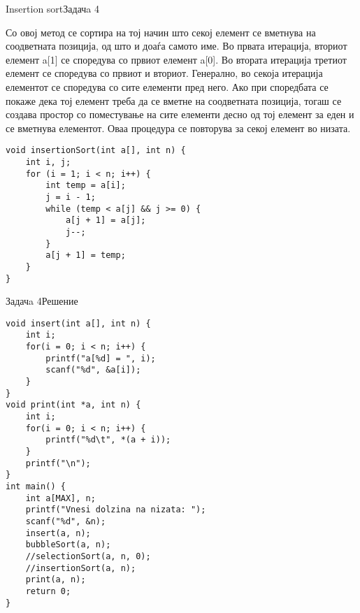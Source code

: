 \begin{frame}[fragile]{Insertion sort}{Задачa 4}
\begin{scriptsize}
Со овој метод се сортира на тој начин што секој елемент се вметнува на
соодветната позиција, од што и доаѓа самото име. Во првата итерација, вториот
елемент a[1] се споредува со првиот елемент a[0]. Во втората итерација третиот
елемент се споредува со првиот и вториот. Генерално, во секоја итерација
елементот се споредува со сите елементи пред него. Ако при споредбата се покаже
дека тој елемент треба да се вметне на соодветната позиција, тогаш се создава
простор со поместување на сите елементи десно од тој елемент за еден и се
вметнува елементот. Оваа процедура се повторува за секој елемент во низата. 
\end{scriptsize}
\begin{lstlisting}
void insertionSort(int a[], int n) {
    int i, j;
    for (i = 1; i < n; i++) {
        int temp = a[i];
        j = i - 1;
        while (temp < a[j] && j >= 0) {
            a[j + 1] = a[j];
            j--;
        }
        a[j + 1] = temp;
    }
}
\end{lstlisting}
\end{frame}

\begin{frame}[fragile]{Задачa 4}{Решение}
\begin{lstlisting}
void insert(int a[], int n) {
    int i;
    for(i = 0; i < n; i++) {
        printf("a[%d] = ", i);
        scanf("%d", &a[i]);
    }
}
void print(int *a, int n) {
    int i;
    for(i = 0; i < n; i++) {
        printf("%d\t", *(a + i));
    }
    printf("\n");
}
int main() {
    int a[MAX], n;
    printf("Vnesi dolzina na nizata: ");
    scanf("%d", &n);
    insert(a, n);
    bubbleSort(a, n);
    //selectionSort(a, n, 0);
    //insertionSort(a, n);
    print(a, n);
    return 0;
}
\end{lstlisting}
\end{frame}
